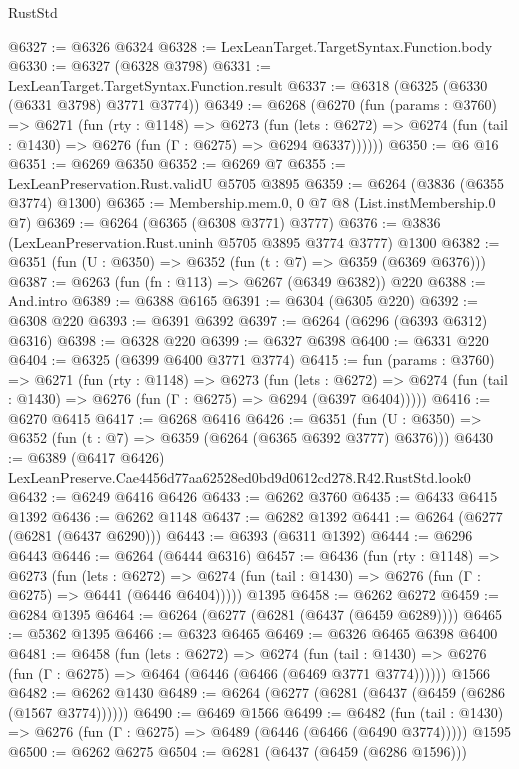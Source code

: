 \begin{lexlean}{RustStd}
\begin{coremodule}
@6327 := @6326 @6324
@6328 := LexLeanTarget.TargetSyntax.Function.body
@6330 := @6327 (@6328 @3798)
@6331 := LexLeanTarget.TargetSyntax.Function.result
@6337 := @6318 (@6325 (@6330 (@6331 @3798) @3771 @3774))
@6349 := @6268
    (@6270
      (fun (params : @3760) =>
      @6271
        (fun (rty : @1148) =>
        @6273
          (fun (lets : @6272) =>
          @6274 (fun (tail : @1430) => @6276 (fun (Γ : @6275) => @6294 @6337))))))
@6350 := @6 @16
@6351 := @6269 @6350
@6352 := @6269 @7
@6355 := LexLeanPreservation.Rust.validU @5705 @3895
@6359 := @6264 (@3836 (@6355 @3774) @1300)
@6365 := Membership.mem.{0, 0} @7 @8 (List.instMembership.{0} @7)
@6369 := @6264 (@6365 (@6308 @3771) @3777)
@6376 := @3836 (LexLeanPreservation.Rust.uninh @5705 @3895 @3774 @3777) @1300
@6382 := @6351 (fun (U : @6350) => @6352 (fun (t : @7) => @6359 (@6369 @6376)))
@6387 := @6263 (fun (fn : @113) => @6267 (@6349 @6382)) @220
@6388 := And.intro
@6389 := @6388 @6165
@6391 := @6304 (@6305 @220)
@6392 := @6308 @220
@6393 := @6391 @6392
@6397 := @6264 (@6296 (@6393 @6312) @6316)
@6398 := @6328 @220
@6399 := @6327 @6398
@6400 := @6331 @220
@6404 := @6325 (@6399 @6400 @3771 @3774)
@6415 := fun (params : @3760) =>
  @6271
    (fun (rty : @1148) =>
    @6273
      (fun (lets : @6272) =>
      @6274 (fun (tail : @1430) => @6276 (fun (Γ : @6275) => @6294 (@6397 @6404)))))
@6416 := @6270 @6415
@6417 := @6268 @6416
@6426 := @6351 (fun (U : @6350) => @6352 (fun (t : @7) => @6359 (@6264 (@6365 @6392 @3777) @6376)))
@6430 := @6389 (@6417 @6426) LexLeanPreserve.Cae4456d77aa62528ed0bd9d0612cd278.R42.RustStd.look0
@6432 := @6249 @6416 @6426
@6433 := @6262 @3760
@6435 := @6433 @6415 @1392
@6436 := @6262 @1148
@6437 := @6282 @1392
@6441 := @6264 (@6277 (@6281 (@6437 @6290)))
@6443 := @6393 (@6311 @1392)
@6444 := @6296 @6443
@6446 := @6264 (@6444 @6316)
@6457 := @6436
    (fun (rty : @1148) =>
    @6273
      (fun (lets : @6272) =>
      @6274 (fun (tail : @1430) => @6276 (fun (Γ : @6275) => @6441 (@6446 @6404)))))
    @1395
@6458 := @6262 @6272
@6459 := @6284 @1395
@6464 := @6264 (@6277 (@6281 (@6437 (@6459 @6289))))
@6465 := @5362 @1395
@6466 := @6323 @6465
@6469 := @6326 @6465 @6398 @6400
@6481 := @6458
    (fun (lets : @6272) =>
    @6274
      (fun (tail : @1430) => @6276 (fun (Γ : @6275) => @6464 (@6446 (@6466 (@6469 @3771 @3774))))))
    @1566
@6482 := @6262 @1430
@6489 := @6264 (@6277 (@6281 (@6437 (@6459 (@6286 (@1567 @3774))))))
@6490 := @6469 @1566
@6499 := @6482
    (fun (tail : @1430) => @6276 (fun (Γ : @6275) => @6489 (@6446 (@6466 (@6490 @3774)))))
    @1595
@6500 := @6262 @6275
@6504 := @6281 (@6437 (@6459 (@6286 @1596)))

\end{coremodule}
\end{lexlean}
